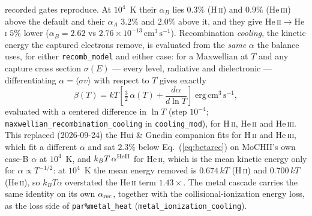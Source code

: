 \documentclass[english,a4paper]{my_memo}
\newcommand{\code}[1]{\texttt{#1}}
\newcommand{\cmc}{\mathrm{cm^{3}\,s^{-1}}}
\begin{document}
recorded gates reproduce.  At $10^4$~K their $\alpha_B$ lies $0.3\%$
(H\,\textsc{ii}) and $0.9\%$ (He\,\textsc{iii}) above the default and their
$\alpha_A$ $3.2\%$ and $2.0\%$ above it, and they give
He\,\textsc{ii}$\to$He\,\textsc{i} $5\%$ lower ($\alpha_B = 2.62$ vs
$2.76{\times}10^{-13}\,\cmc$).
Recombination \emph{cooling}, the kinetic energy the captured electrons
remove, is evaluated from the \emph{same} $\alpha$ the balance uses, for
either \code{recomb\_model} and either case: for a Maxwellian at $T$ and any
capture cross section $\sigma(E)$ --- every level, radiative and
dielectronic --- differentiating $\alpha = \langle\sigma v\rangle$ with
respect to $T$ gives exactly
\begin{equation}
  \beta(T) = k T\left[\tfrac{3}{2}\,\alpha(T)
             + \frac{d\alpha}{d\ln T}\right]
  \;\mathrm{erg\,cm^3\,s^{-1}},
  \label{eq:betarec}
\end{equation}
evaluated with a centered difference in $\ln T$ (step $10^{-4}$;
\code{maxwellian\_recombination\_cooling} in \code{cooling\_mod}), for
H\,\textsc{ii}, He\,\textsc{ii} and He\,\textsc{iii}.  This replaced
(2026-09-24) the Hui \& Gnedin companion fits for H\,\textsc{ii} and
He\,\textsc{iii}, which fit a different $\alpha$ and sat $2.3\%$ below
Eq.~(\ref{eq:betarec}) on MoCHII's own case-B $\alpha$ at $10^4$~K, and
$k_B T\,\alpha^{\rm HeII}$ for He\,\textsc{ii}, which is the mean kinetic
energy only for $\alpha \propto T^{-1/2}$: at $10^4$~K the mean energy
removed is $0.674\,kT$ (H\,\textsc{ii}) and $0.700\,kT$ (He\,\textsc{ii}),
so $k_BT\alpha$ overstated the He\,\textsc{ii} term $1.43\times$.  The
metal cascade carries the same identity on its own $\alpha_{\rm rec}$,
together with the collisional-ionization energy loss, as the loss side of
\code{par\%metal\_heat} (\code{metal\_ionization\_cooling}).
\end{document}
